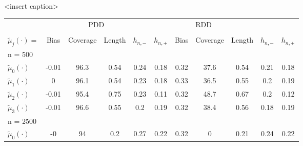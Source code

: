 \renewcommand{\arraystretch}{1.5}
\begin{table}[H]
\begin{center}
<insert caption>
\begin{tabular}{l@{\hskip 1em}c@{\hskip 1em}c@{\hskip 1em}c@{\hskip 1em}c@{\hskip 1em}c@{\hskip 1em}c@{\hskip 1em}c@{\hskip 1em}c@{\hskip 1em}c@{\hskip 1em}c}
\toprule
& \multicolumn{4}{c}{PDD} & \multicolumn{4}{c}{RDD} \\[-0.25em] 
\cmidrule(r{2em}){2-5} \cmidrule(r){6-9} & \\[-1.75em]
\hline
 $\tilde{\mu}_{j}(\cdot) = $              &   Bias &   Coverage &   Length &   $h_{n, -}$ &   $h_{n, +}$ &   Bias\vphantom{l} &   Coverage\vphantom{l} &   Length\vphantom{l} &   $h_{n, -}$\vphantom{l} &   $h_{n, +}$\vphantom{l} \\
\hline
 n = 500                                  &     &         &       &           &           &                 &                     &                   &                       &                       \\
 $\tilde{\mu}_{0}(\cdot)$\vphantom{500}   &  -0.01 &       96.3 &     0.54 &         0.24 &         0.18 &               0.32 &                   37.6 &                 0.54 &                     0.21 &                     0.18 \\
 $\tilde{\mu}_{1}(\cdot)$\vphantom{500}   &   0    &       96.1 &     0.54 &         0.23 &         0.18 &               0.33 &                   36.5 &                 0.55 &                     0.2  &                     0.19 \\
 $\tilde{\mu}_{2}(\cdot)$\vphantom{500}   &  -0.01 &       95.4 &     0.75 &         0.23 &         0.11 &               0.32 &                   48.7 &                 0.67 &                     0.2  &                     0.12 \\
 $\tilde{\mu}_{3}(\cdot)$\vphantom{500}   &  -0.01 &       96.6 &     0.55 &         0.2  &         0.19 &               0.32 &                   38.4 &                 0.56 &                     0.18 &                     0.19 \\
 n = 2500                                 &     &         &       &           &           &                 &                     &                   &                       &                       \\
 $\tilde{\mu}_{0}(\cdot)$\vphantom{2500}  &  -0    &       94   &     0.2  &         0.27 &         0.22 &               0.32 &                    0   &                 0.21 &                     0.24 &                     0.22 \\

\end{tabular}
\end{center}
\end{table}
